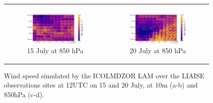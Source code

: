 \begin{figure}[hbtp]
\begin{tabular}{cc}
        \begin{subfigure}[t]{0.5\textwidth}
            \caption{15 July at 850 hPa}
            \includegraphics[width=\textwidth]{images/chap6/IOP_maps/lmdz_wind850_2021-07-15_12UTC.png}
        \end{subfigure} &
        \begin{subfigure}[t]{0.5\textwidth}
            \caption{20 July at 850 hPa}
            \includegraphics[width=\textwidth]{images/chap6/IOP_maps/lmdz_wind850_2021-07-20_12UTC.png}
        \end{subfigure} \\
    \end{tabular}
    \caption{Wind speed simulated by the ICOLMDZOR LAM over the LIAISE observations sites at 12UTC on 15 and 20 July, at 10m (a-b) and 850hPa (c-d).}
    \label{fig:iop_days_vertwinds}
\end{figure}
\clearpage

